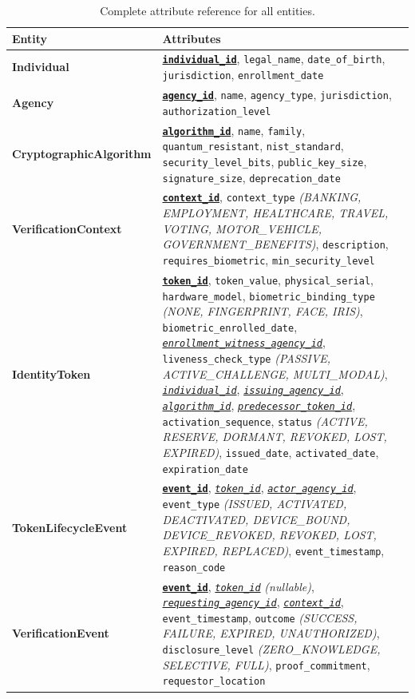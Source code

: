 \documentclass[11pt,letterpaper]{article}
\newcommand{\pk}[1]{\underline{\textbf{\texttt{#1}}}}
\newcommand{\fk}[1]{\underline{\textit{\texttt{#1}}}}
\newcommand{\thead}[1]{\textbf{\color{white}\small #1}}
\begin{document}
\begin{table}[H]
\centering
\footnotesize
\caption{Complete attribute reference for all entities.}
\label{tab:entities}
\setlength{\tabcolsep}{5pt}
\renewcommand{\arraystretch}{1.15}
\begin{tabularx}{\textwidth}{>{\bfseries}p{1.62in} >{\RaggedRight\arraybackslash}X}
\toprule
\rowcolor{tabheader}
\thead{Entity} & \thead{Attributes} \\
\midrule
Individual & \pk{individual\_id}, \texttt{legal\_name}, \texttt{date\_of\_birth}, \texttt{jurisdiction}, \texttt{enrollment\_date} \\
Agency & \pk{agency\_id}, \texttt{name}, \texttt{agency\_type}, \texttt{jurisdiction}, \texttt{authorization\_level} \\
CryptographicAlgorithm & \pk{algorithm\_id}, \texttt{name}, \texttt{family}, \texttt{quantum\_resistant}, \texttt{nist\_standard}, \texttt{security\_level\_bits}, \texttt{public\_key\_size}, \texttt{signature\_size}, \texttt{deprecation\_date} \\
VerificationContext & \pk{context\_id}, \texttt{context\_type} \textit{(BANKING, EMPLOYMENT, HEALTHCARE, TRAVEL, VOTING, MOTOR\_VEHICLE, GOVERNMENT\_BENEFITS)}, \texttt{description}, \texttt{requires\_biometric}, \texttt{min\_security\_level} \\
IdentityToken & \pk{token\_id}, \texttt{token\_value}, \texttt{physical\_serial}, \texttt{hardware\_model}, \texttt{biometric\_binding\_type} \textit{(NONE, FINGERPRINT, FACE, IRIS)}, \texttt{biometric\_enrolled\_date}, \fk{enrollment\_witness\_agency\_id}, \texttt{liveness\_check\_type} \textit{(PASSIVE, ACTIVE\_CHALLENGE, MULTI\_MODAL)}, \fk{individual\_id}, \fk{issuing\_agency\_id}, \fk{algorithm\_id}, \fk{predecessor\_token\_id}, \texttt{activation\_sequence}, \texttt{status} \textit{(ACTIVE, RESERVE, DORMANT, REVOKED, LOST, EXPIRED)}, \texttt{issued\_date}, \texttt{activated\_date}, \texttt{expiration\_date} \\
TokenLifecycleEvent & \pk{event\_id}, \fk{token\_id}, \fk{actor\_agency\_id}, \texttt{event\_type} \textit{(ISSUED, ACTIVATED, DEACTIVATED, DEVICE\_BOUND, DEVICE\_REVOKED, REVOKED, LOST, EXPIRED, REPLACED)}, \texttt{event\_timestamp}, \texttt{reason\_code} \\
VerificationEvent & \pk{event\_id}, \fk{token\_id} \textit{(nullable)}, \fk{requesting\_agency\_id}, \fk{context\_id}, \texttt{event\_timestamp}, \texttt{outcome} \textit{(SUCCESS, FAILURE, EXPIRED, UNAUTHORIZED)}, \texttt{disclosure\_level} \textit{(ZERO\_KNOWLEDGE, SELECTIVE, FULL)}, \texttt{proof\_commitment}, \texttt{requestor\_location} \\

\end{tabularx}
\end{table}
\end{document}
